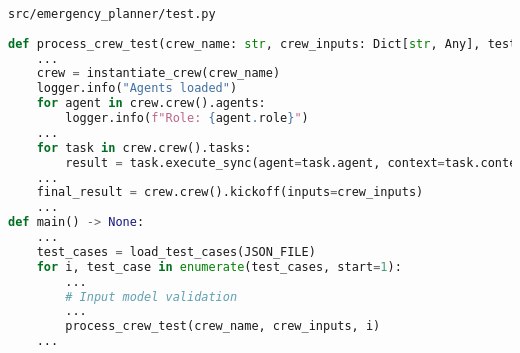 \begin{frame}[fragile]{\texttt{src/emergency\_planner/test.py}}
    \vspace{-0.3cm}
    \begin{lstlisting}[language=Python]
def process_crew_test(crew_name: str, crew_inputs: Dict[str, Any], test_index: int) -> None:
    ...
    crew = instantiate_crew(crew_name)
    logger.info("Agents loaded")
    for agent in crew.crew().agents:
        logger.info(f"Role: {agent.role}")
    ...
    for task in crew.crew().tasks:
        result = task.execute_sync(agent=task.agent, context=task.context, tools=task.tools)
    ...
    final_result = crew.crew().kickoff(inputs=crew_inputs)
    ...
def main() -> None:
    ...
    test_cases = load_test_cases(JSON_FILE)
    for i, test_case in enumerate(test_cases, start=1):
        ...
        # Input model validation
        ...
        process_crew_test(crew_name, crew_inputs, i)
    ...
    \end{lstlisting}
\end{frame}